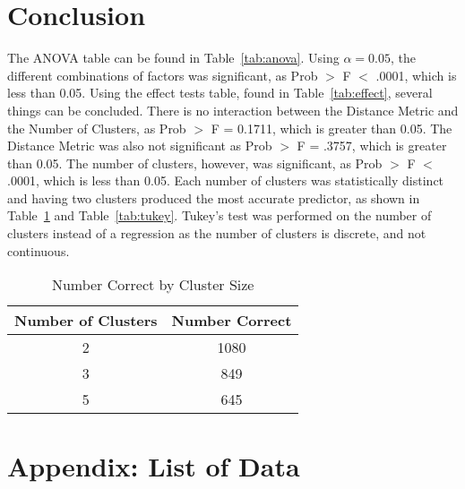 \documentclass[times]{article}
\begin{document}
   \section{Conclusion}

   The ANOVA table can be found in Table~\ref{tab:anova}.
   Using $\alpha = 0.05$, the different combinations of factors was significant, as
   Prob $>$ F $<$ .0001, which is less than 0.05.
   Using the effect tests table, found in Table~\ref{tab:effect}, several things can be concluded.
   There is no interaction between the Distance Metric and the Number
   of Clusters, as Prob $>$ F = 0.1711, which is greater than 0.05.
   The Distance Metric was also not significant as Prob $>$ F = .3757, which is greater than 0.05.
   The number of clusters, however, was significant, as Prob $>$ F $<$ .0001, which is less than 0.05.
   Each number of clusters was statistically distinct and having two clusters produced the most 
   accurate predictor, as shown in Table~\ref{tab:by_cluster} and Table~\ref{tab:tukey}.  
   Tukey's test was performed on the number of clusters instead of a regression as the number of
   clusters is discrete, and not continuous.
   
   \begin{table}[H]
      \centering
      \caption{Number Correct by Cluster Size}
      \label{tab:by_cluster}
      \begin{tabular}{| c | c |}
         \hline
         Number of Clusters & Number Correct \\
         \hline
         2 & 1080 \\
         \hline
         3 & 849 \\
         \hline
         5 & 645 \\
         \hline
      \end{tabular}
   \end{table}

   \appendix
   \section{Appendix: List of Data}
\end{document}
